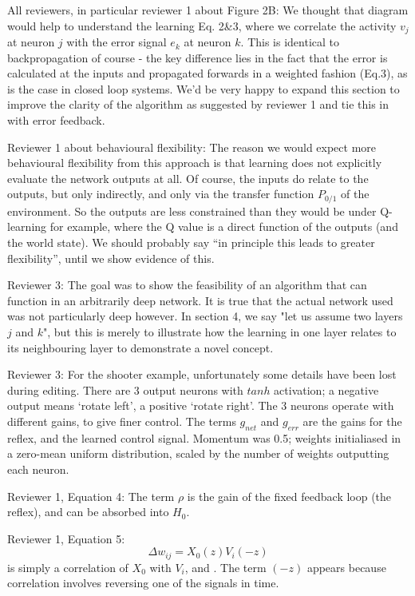 \documentclass{article}
\begin{document}
All reviewers, in particular reviewer 1 about Figure 2B: We thought
that diagram would help to understand the learning Eq. 2\&3, where we
correlate the activity $v_{j}$ at neuron $j$ with the error signal
$e_{k}$ at neuron $k$. This is identical to backpropagation of course
- the key difference lies in the fact that the error is calculated at
the inputs and propagated forwards in a weighted fashion (Eq.3), as is the
case in closed loop systems. We'd be very happy to expand this section to
improve the clarity of the algorithm as suggested by reviewer 1 and tie
this in with error feedback.
			
Reviewer 1 about behavioural flexibility:
The reason we would expect more behavioural flexibility from this
approach is that learning does not explicitly evaluate the network
outputs at all. Of course, the inputs do relate to the outputs, but
only indirectly, and only via the transfer function $P_{0/1}$ of the
environment. So the outputs are less constrained than they would be
under Q-learning for example, where the Q value is a direct function
of the outputs (and the world state). We should probably say ``in
principle this leads to greater flexibility'', until we show evidence
of this.
	
Reviewer 3: The goal was to show the feasibility of an algorithm that can function
in an arbitrarily deep network. It is true that the actual network
used was not particularly deep however. In section 4, we say "let us
assume two layers $j$ and $k$", but this is merely to illustrate how
the learning in one layer relates to its neighbouring layer to demonstrate
a novel concept.
	
Reviewer 3: For the shooter example, unfortunately some details have been lost
during editing. There are 3 output neurons with $tanh$ activation; a
negative output means ‘rotate left’, a positive ‘rotate right’. The 3
neurons operate with different gains, to give finer control. The terms
$g_{net}$ and $g_{err}$ are the gains for the reflex, and the learned
control signal.  Momentum was 0.5; weights initialiased in a zero-mean
uniform distribution, scaled by the number of weights outputting each
neuron.
	
Reviewer 1, Equation 4: The term $\rho$ is the gain of the fixed feedback loop
(the reflex), and can be absorbed into $H_{0}$.
	
Reviewer 1, Equation 5:
\begin{equation}
\Delta w_{ij} = X_0(z) V_i(-z) \nonumber
\end{equation}
is simply a correlation of $X_{0}$ with $V_{i}$, and . The term $(-z)$
appears because correlation involves reversing one of the signals in
time.

	
\end{document}
